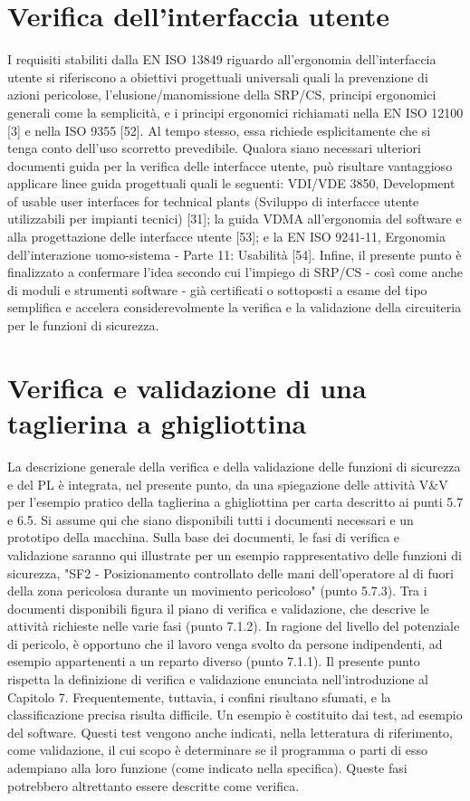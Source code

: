 \section{Verifica dell'interfaccia utente}
\label{sec:07-7}
I requisiti stabiliti dalla EN ISO 13849 riguardo all'ergonomia dell'interfaccia utente si riferiscono a obiettivi progettuali universali quali la prevenzione di azioni pericolose, l'elusione/manomissione della SRP/CS, principi ergonomici generali come la semplicità, e i principi ergonomici richiamati nella EN ISO 12100 [3] e nella ISO 9355 [52]. Al tempo stesso, essa richiede esplicitamente che si tenga conto dell'uso scorretto prevedibile.
Qualora siano necessari ulteriori documenti guida per la verifica delle interfacce utente, può risultare vantaggioso applicare linee guida progettuali quali le seguenti: VDI/VDE 3850, Development of usable user interfaces for technical plants (Sviluppo di interfacce utente utilizzabili per impianti tecnici) [31]; la guida VDMA all'ergonomia del software e alla progettazione delle interfacce utente [53]; e la EN ISO 9241-11, Ergonomia dell'interazione uomo-sistema - Parte 11: Usabilità [54].
Infine, il presente punto è finalizzato a confermare l'idea secondo cui l'impiego di SRP/CS - così come anche di moduli e strumenti software - già certificati o sottoposti a esame del tipo semplifica e accelera considerevolmente la verifica e la validazione della circuiteria per le funzioni di sicurezza.

\section{Verifica e validazione di una taglierina a ghigliottina}
\label{sec:07-8}
La descrizione generale della verifica e della validazione delle funzioni di sicurezza e del PL è integrata, nel presente punto, da una spiegazione delle attività V\&V per l'esempio pratico della taglierina a ghigliottina per carta descritto ai punti 5.7 e 6.5. Si assume qui che siano disponibili tutti i documenti necessari e un prototipo della macchina. Sulla base dei documenti, le fasi di verifica e validazione saranno qui illustrate per un esempio rappresentativo delle funzioni di sicurezza, "SF2 - Posizionamento controllato delle mani dell'operatore al di fuori della zona pericolosa durante un movimento pericoloso" (punto 5.7.3). Tra i documenti disponibili figura il piano di verifica e validazione, che descrive le attività richieste nelle varie fasi (punto 7.1.2). In ragione del livello del potenziale di pericolo, è opportuno che il lavoro venga svolto da persone indipendenti, ad esempio appartenenti a un reparto diverso (punto 7.1.1).
Il presente punto rispetta la definizione di verifica e validazione enunciata nell'introduzione al Capitolo 7. Frequentemente, tuttavia, i confini risultano sfumati, e la classificazione precisa risulta difficile. Un esempio è costituito dai test, ad esempio del software. Questi test vengono anche indicati, nella letteratura di riferimento, come validazione, il cui scopo è determinare se il programma o parti di esso adempiano alla loro funzione (come indicato nella specifica). Queste fasi potrebbero altrettanto essere descritte come verifica.

